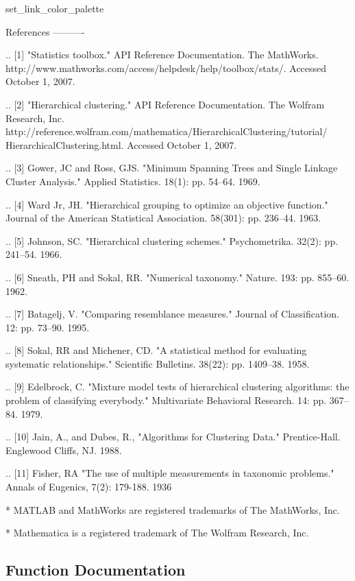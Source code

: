 \begin{DoxyVerb}
   set_link_color_palette

References
----------

.. [1] "Statistics toolbox." API Reference Documentation. The MathWorks.
   http://www.mathworks.com/access/helpdesk/help/toolbox/stats/.
   Accessed October 1, 2007.

.. [2] "Hierarchical clustering." API Reference Documentation.
   The Wolfram Research, Inc.
   http://reference.wolfram.com/mathematica/HierarchicalClustering/tutorial/
   HierarchicalClustering.html.
   Accessed October 1, 2007.

.. [3] Gower, JC and Ross, GJS. "Minimum Spanning Trees and Single Linkage
   Cluster Analysis." Applied Statistics. 18(1): pp. 54--64. 1969.

.. [4] Ward Jr, JH. "Hierarchical grouping to optimize an objective
   function." Journal of the American Statistical Association. 58(301):
   pp. 236--44. 1963.

.. [5] Johnson, SC. "Hierarchical clustering schemes." Psychometrika.
   32(2): pp. 241--54. 1966.

.. [6] Sneath, PH and Sokal, RR. "Numerical taxonomy." Nature. 193: pp.
   855--60. 1962.

.. [7] Batagelj, V. "Comparing resemblance measures." Journal of
   Classification. 12: pp. 73--90. 1995.

.. [8] Sokal, RR and Michener, CD. "A statistical method for evaluating
   systematic relationships." Scientific Bulletins. 38(22):
   pp. 1409--38. 1958.

.. [9] Edelbrock, C. "Mixture model tests of hierarchical clustering
   algorithms: the problem of classifying everybody." Multivariate
   Behavioral Research. 14: pp. 367--84. 1979.

.. [10] Jain, A., and Dubes, R., "Algorithms for Clustering Data."
   Prentice-Hall. Englewood Cliffs, NJ. 1988.

.. [11] Fisher, RA "The use of multiple measurements in taxonomic
   problems." Annals of Eugenics, 7(2): 179-188. 1936


* MATLAB and MathWorks are registered trademarks of The MathWorks, Inc.

* Mathematica is a registered trademark of The Wolfram Research, Inc.\end{DoxyVerb}
 

\subsection{Function Documentation}
\hypertarget{namespacescipy_1_1cluster_1_1hierarchy_ab27ced3081d3d6da023b5c0885863d30}{}
